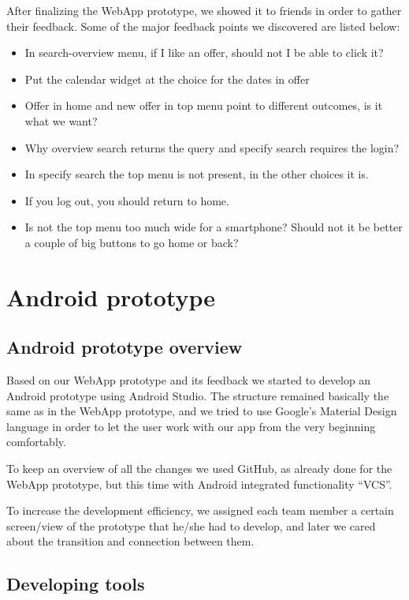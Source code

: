 \documentclass[11pt,twoside,a4paper]{report}
\begin{document}
After finalizing the WebApp prototype, we showed it to friends in order to gather their feedback. Some of the major feedback points we discovered are listed below:

\begin{itemize}
\item In search-overview menu, if I like an offer, should not I be able to click it?
\item Put the calendar widget at the choice for the dates in offer
\item Offer in home and new offer in top menu point to different outcomes, is it what we want?
\item Why overview search returns the query and specify search requires the login?
\item In specify search the top menu is not present, in the other choices it is.
\item If you log out, you should return to home.
\item Is not the top menu too much wide for a smartphone? Should not it be better a couple of big buttons to go home or back?
\end{itemize}

\chapter{Android prototype}

\section{Android prototype overview}

Based on our WebApp prototype and its feedback we started to develop an Android prototype using Android Studio. The structure remained basically the same as in the WebApp prototype, and we tried to use Google's Material Design language in order to let the user work with our app from the very beginning comfortably.

To keep an overview of all the changes we used GitHub, as already done for the WebApp prototype, but this time with Android integrated functionality ``VCS''.

To increase the development efficiency, we assigned each team member a certain screen/view of the prototype that he/she had to develop, and later we cared about the transition and connection between them.

\section{Developing tools}
\end{document}
